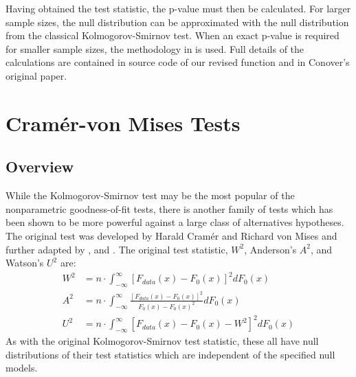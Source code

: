 
Having obtained the test statistic, the p-value must then be calculated. 
For larger sample sizes, the null distribution can be approximated
with the null distribution from the classical Kolmogorov-Smirnov test. 
When an exact p-value is required for
smaller sample sizes, the methodology in \citet{Conover1972} is used. 
Full details of the calculations are contained in source code
of our revised function  and in Conover's original paper. 




\section{Cram\'{e}r-von Mises Tests}

\subsection{Overview}


While the Kolmogorov-Smirnov test may be the most popular of
the nonparametric goodness-of-fit tests, there is another family of 
tests which has been shown to be more powerful against a large class
of alternatives hypotheses. 
The original test was developed by
Harald Cram\'{e}r and Richard von Mises \citep{cramer1928, vonmises1928} and further adapted by \cite{anderson1952}, and  \cite{Watson1961}. 
The original test statistic, $W^2$, Anderson's $A^2$, and Watson's
$U^2$ are:
\begin{align}
W^2 &= n \cdot \int_{-\infty}^{\infty} \left[ F_{data}(x)- F_{0}(x) \right]^2 dF_0(x) \label{W2} \\
A^2 &= n \cdot \int_{-\infty}^{\infty} \frac{\left[F_{data}(x)- F_{0}(x) \right]^2}{F_0(x) -F_0(x)^2} dF_0(x) \label{A2} \\
U^2 &= n \cdot \int_{-\infty}^{\infty} \left[ F_{data}(x)- F_{0}(x) - W^2 \right]^2 dF_0(x) \label{U2}
\end{align}
As with the original Kolmogorov-Smirnov test statistic, these all have 
null distributions of their test statistics which are independent of the
specified null models.

